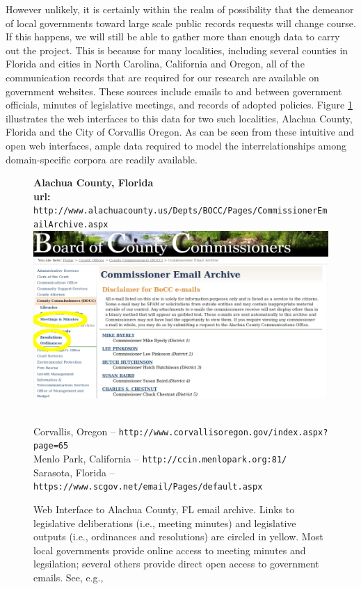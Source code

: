  However unlikely, it is certainly within the realm of possibility that the demeanor of local governments toward large scale public records requests will change course. If this happens, we will still be able to gather more than enough data to carry out the project. This is because for many localities, including several counties in Florida and cities in North Carolina, California and Oregon, all of the communication records that are required for our research are available on government websites. These sources include emails to and between government officials, minutes of legislative meetings, and records of adopted policies. Figure \ref{screens} illustrates the web interfaces to this data for two such localities, Alachua County, Florida and the City of Corvallis Oregon. As can be seen from these intuitive and open web interfaces, ample data required to model the interrelationships among domain-specific corpora are readily available.

\begin{figure}[h]
\begin{center}
{\bf Alachua County, Florida} \\
 {\bf url:} \texttt{http://www.alachuacounty.us/Depts/BOCC/Pages/CommissionerEmailArchive.aspx} \\
 \includegraphics[scale=.45]{AlachuaBOCC.jpg} \\~\\
\end{center} \vspace{-1cm}
\caption{Web Interface to Alachua County, FL email archive. Links to legislative deliberations (i.e., meeting minutes) and legislative outputs (i.e., ordinances and resolutions) are circled in yellow. Most local governments provide online access to meeting minutes and legsilation; several others provide direct open access to government emails. See, e.g.,}  Corvallis, Oregon -- \texttt{http://www.corvallisoregon.gov/index.aspx?page=65} \\ Menlo Park, California -- \texttt{http://ccin.menlopark.org:81/}  \\ Sarasota, Florida -- \texttt{https://www.scgov.net/email/Pages/default.aspx} 

\label{screens}
\end{figure}

